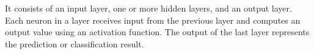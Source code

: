 



It consists of an input layer, one or more hidden layers, and an output layer. Each neuron in a layer receives input from the previous layer and computes an output value using an activation function. The output of the last layer represents the prediction or classification result.





\newpage


